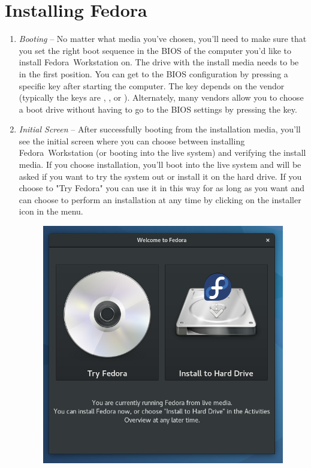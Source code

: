\section*{Installing Fedora}
\begin{enumerate}
\item\emph{Booting} -- No matter what media you've chosen, you'll need to make sure that you set the right boot sequence in the BIOS of the computer you'd like to install Fedora~Workstation on. The drive with the install media needs to be in the first position. You can get to the BIOS configuration by pressing a specific key after starting the computer. The key depends on the vendor (typically the keys are , , or ). Alternately, many vendors allow you to choose a boot drive without having to go to the BIOS settings by pressing the  key.

\item\emph{Initial Screen} -- After successfully booting from the installation media, you'll see the initial screen where you can choose between installing Fedora~Workstation (or booting into the live system) and verifying the install media. If you choose installation, you'll boot into the live system and will be asked if you want to try the system out or install it on the hard drive. If you choose to "Try Fedora" you can use it in this way for as long as you want and can choose to perform an installation at any time by clicking on the installer icon in the menu.

\begin{figure}[ht]
\begin{center}
\includegraphics[width=.75\textwidth]{img/installer-a}
 \label{fig:installer-a}
\end{center}
\end{figure}


\end{enumerate}
